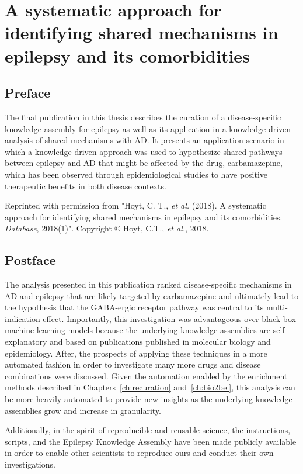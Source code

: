 \chapter{A systematic approach for identifying shared mechanisms in epilepsy and its comorbidities}
\label{ch:epicom}

\section*{Preface}

The final publication in this thesis describes the curation of a disease-specific knowledge assembly for epilepsy as well as its application in a knowledge-driven analysis of shared mechanisms with \ac{AD}.
It presents an application scenario in which a knowledge-driven approach was used to hypothesize shared pathways between epilepsy and \ac{AD} that might be affected by the drug, carbamazepine, which has been observed through epidemiological studies to have positive therapeutic benefits in both disease contexts.

\vspace*{\fill}

Reprinted with permission from "Hoyt, C. T., \textit{et al.} (2018). A systematic approach for identifying shared mechanisms in epilepsy and its comorbidities. \textit{Database}, 2018(1)".
Copyright © Hoyt, C.T., \textit{et al.}, 2018.



\section*{Postface}

The analysis presented in this publication ranked disease-specific mechanisms in \ac{AD} and epilepsy that are likely targeted by carbamazepine and ultimately lead to the hypothesis that the GABA-ergic receptor pathway was central to its multi-indication effect.
Importantly, this investigation was advantageous over black-box machine learning models because the underlying knowledge assemblies are self-explanatory and based on publications published in molecular biology and epidemiology.
After, the prospects of applying these techniques in a more automated fashion in order to investigate many more drugs and disease combinations were discussed.
Given the automation enabled by the enrichment methods described in Chapters~\ref{ch:recuration} and~\ref{ch:bio2bel}, this analysis can be more heavily automated to provide new insights as the underlying knowledge assemblies grow and increase in granularity.

Additionally, in the spirit of reproducible and reusable science, the instructions, scripts, and the Epilepsy Knowledge Assembly have been made publicly available in order to enable other scientists to reproduce ours and conduct their own investigations.
